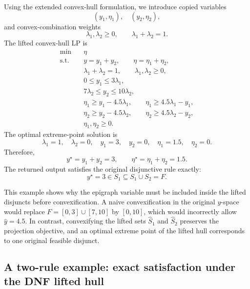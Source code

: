 \documentclass{article}
\theoremstyle{plain}
\theoremstyle{definition}
\theoremstyle{remark}
\begin{document}
Using the extended convex-hull formulation, we introduce copied variables
\[
    (y_1,\eta_1),\quad (y_2,\eta_2),
\]
and convex-combination weights
\[
    \lambda_1,\lambda_2\ge0,
    \qquad
    \lambda_1+\lambda_2=1.
\]
The lifted convex-hull LP is
\[
\begin{aligned}
\min \quad & \eta\\
\mathrm{s.t.}\quad
    & y=y_1+y_2,\qquad \eta=\eta_1+\eta_2,\\
    & \lambda_1+\lambda_2=1,\qquad \lambda_1,\lambda_2\ge0,\\
    & 0\le y_1\le 3\lambda_1,\\
    & 7\lambda_2\le y_2\le 10\lambda_2,\\
    & \eta_1\ge y_1-4.5\lambda_1,\qquad
      \eta_1\ge 4.5\lambda_1-y_1,\\
    & \eta_2\ge y_2-4.5\lambda_2,\qquad
      \eta_2\ge 4.5\lambda_2-y_2,\\
    & \eta_1,\eta_2\ge0.
\end{aligned}
\]
The optimal extreme-point solution is
\[
    \lambda_1=1,\quad \lambda_2=0,\quad
    y_1=3,\quad y_2=0,\quad
    \eta_1=1.5,\quad \eta_2=0.
\]
Therefore,
\[
    y^\star=y_1+y_2=3,
    \qquad
    \eta^\star=\eta_1+\eta_2=1.5.
\]
The returned output satisfies the original disjunctive rule exactly:
\[
    y^\star=3\in S_1\subseteq S_1\cup S_2=F.
\]

This example shows why the epigraph variable must be included inside the lifted disjuncts before convexification. A naive convexification in the original \(y\)-space would replace \(F=[0,3]\cup[7,10]\) by \([0,10]\), which would incorrectly allow \(\hat y=4.5\). In contrast, convexifying the lifted sets \(\widehat S_1\) and \(\widehat S_2\) preserves the projection objective, and an optimal extreme point of the lifted hull corresponds to one original feasible disjunct.

\subsection{A two-rule example: exact satisfaction under the DNF lifted hull}
\label{app:two-rule-example}
\end{document}
